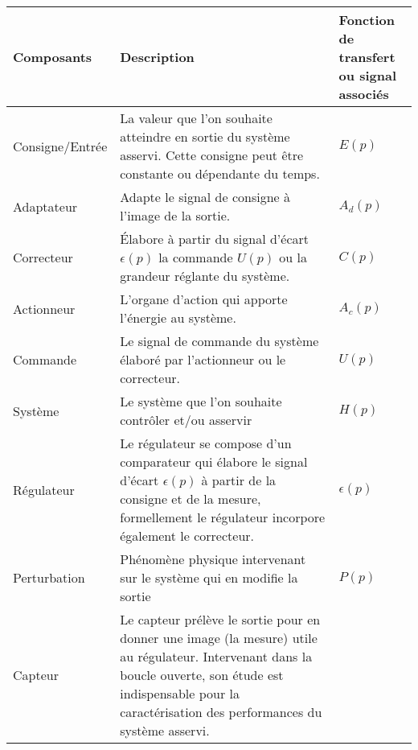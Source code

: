 \begin{table}[!h]
    \centering
    \begin{tabular}{@{}P{0.2\linewidth}m{0.6\linewidth}P{0.2\linewidth}@{}}
    \toprule
Composants      & Description & Fonction de transfert ou signal associés\\
    \midrule
Consigne/Entrée & La valeur que l'on souhaite atteindre en sortie 
                  du système asservi. Cette consigne peut être constante 
                  ou dépendante du temps. 
                & $E(p)$                                                \\
Adaptateur      & Adapte le signal de consigne à l'image de la sortie.
                & $A_d(p)$                                              \\
Correcteur      & \'Elabore à partir du signal d'écart $\epsilon(p)$ 
                  la commande $U(p)$ ou la grandeur réglante du système.
                & $C(p)$                                                \\
Actionneur      & L'organe d'action qui apporte l'énergie au système.
                & $A_c(p)$                                              \\
Commande        & Le signal de commande du système élaboré par l'actionneur 
		                  ou le correcteur.
                & $U(p)$                                                \\
Système         & Le système que l'on souhaite contrôler et/ou asservir
                & $H(p)$                                                \\
Régulateur      & Le régulateur se compose d'un comparateur qui élabore le 
                  signal d'écart $\epsilon(p)$ à partir de la consigne et de 
                  la mesure, formellement le régulateur incorpore 
                  également le correcteur.
                & $\epsilon(p)$                                         \\
Perturbation    & Phénomène physique intervenant sur le système qui 
                  en modifie la sortie
                & $P(p)$                                                \\
Capteur         &  Le capteur prélève le sortie pour en donner une 
                   image (la mesure) utile au régulateur. 
                   Intervenant dans la boucle ouverte, son étude 
                   est indispensable pour la caractérisation des 
                   performances du système asservi.

\end{tabular}
\end{table}
